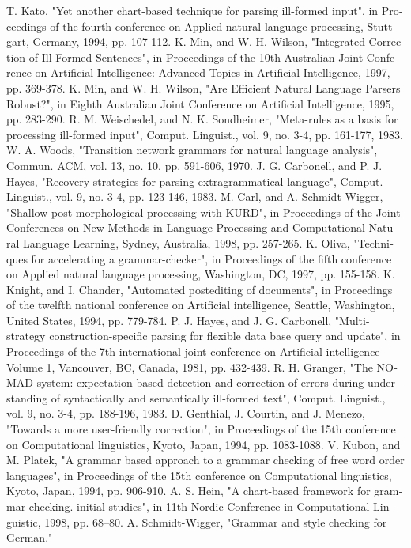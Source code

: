 \documentclass{report}
\begin{document}
\begin{thebibliography}{9}
\begin{latin}
T. Kato, "Yet another chart-based technique for parsing ill-formed input", in Proceedings of the fourth conference on Applied natural language processing, Stuttgart, Germany, 1994, pp. 107-112.
K. Min, and W. H. Wilson, "Integrated Correction of Ill-Formed Sentences", in Proceedings of the 10th Australian Joint Conference on Artificial Intelligence: Advanced Topics in Artificial Intelligence, 1997, pp. 369-378.
K. Min, and W. H. Wilson, "Are Efficient Natural Language Parsers Robust?", in Eighth Australian Joint Conference on Artificial Intelligence, 1995, pp. 283-290.
R. M. Weischedel, and N. K. Sondheimer, "Meta-rules as a basis for processing ill-formed input", Comput. Linguist., vol. 9, no. 3-4, pp. 161-177, 1983.
W. A. Woods, "Transition network grammars for natural language analysis", Commun. ACM, vol. 13, no. 10, pp. 591-606, 1970.
J. G. Carbonell, and P. J. Hayes, "Recovery strategies for parsing extragrammatical language", Comput. Linguist., vol. 9, no. 3-4, pp. 123-146, 1983.
M. Carl, and A. Schmidt-Wigger, "Shallow post morphological processing with KURD", in Proceedings of the Joint Conferences on New Methods in Language Processing and Computational Natural Language Learning, Sydney, Australia, 1998, pp. 257-265.
K. Oliva, "Techniques for accelerating a grammar-checker", in Proceedings of the fifth conference on Applied natural language processing, Washington, DC, 1997, pp. 155-158.
K. Knight, and I. Chander, "Automated postediting of documents", in Proceedings of the twelfth national conference on Artificial intelligence, Seattle, Washington, United States, 1994, pp. 779-784.
P. J. Hayes, and J. G. Carbonell, "Multi-strategy construction-specific parsing for flexible data base query and update", in Proceedings of the 7th international joint conference on Artificial intelligence - Volume 1, Vancouver, BC, Canada, 1981, pp. 432-439.
R. H. Granger, "The NOMAD system: expectation-based detection and correction of errors during understanding of syntactically and semantically ill-formed text", Comput. Linguist., vol. 9, no. 3-4, pp. 188-196, 1983.
D. Genthial, J. Courtin, and J. Menezo, "Towards a more user-friendly correction", in Proceedings of the 15th conference on Computational linguistics, Kyoto, Japan, 1994, pp. 1083-1088.
V. Kubon, and M. Platek, "A grammar based approach to a grammar checking of free word order languages", in Proceedings of the 15th conference on Computational linguistics, Kyoto, Japan, 1994, pp. 906-910.
A. S. Hein, "A chart-based framework for grammar checking. initial studies", in 11th Nordic Conference in Computational Linguistic, 1998, pp. 68–80.
A. Schmidt-Wigger, "Grammar and style checking for German."
\end{latin}
\end{thebibliography}
\end{document}
